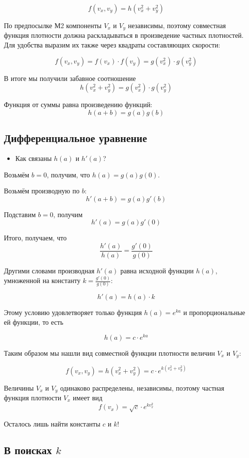 \documentclass[11pt,russian,]{article}
\providecommand{\tightlist}{%
  \setlength{\itemsep}{0pt}\setlength{\parskip}{0pt}}
\begin{document}
\[
f(v_x, v_y) = h(v_x^2 + v_y^2)
\]

По предпосылке М2 компоненты \(V_x\) и \(V_y\) независимы, поэтому
совместная функция плотности должна раскладываться в произведение
частных плотностей. Для удобства выразим их также через квадраты
составляющих скорости:

\[
f(v_x, v_y) = f(v_x) \cdot f(v_y) = g(v_x^2) \cdot g(v_y^2)
\]

В итоге мы получили забавное соотношение \[
h(v_x^2 + v_y^2) = g(v_x^2) \cdot g(v_y^2)
\]

Функция от суммы равна произведению функций: \[
h(a + b) = g(a)g(b)
\]

\subsection{Дифференциальное уравнение}\label{-}

\begin{itemize}
\tightlist
\item
  Как связаны \(h(a)\) и \(h'(a)\)?
\end{itemize}

Возьмём \(b=0\), получим, что \(h(a)=g(a)g(0)\).

Возьмём производную по \(b\): \[
h'(a+b)=g(a)g'(b)
\]

Подставим \(b=0\), получим \[
h'(a)=g(a)g'(0)
\]

Итого, получаем, что \[
\frac{h'(a)}{h(a)} = \frac{g'(0)}{g(0)}
\]

Другими словами производная \(h'(a)\) равна исходной функции \(h(a)\),
умноженной на константу \(k=\frac{g'(0)}{g(0)}\):

\[
h'(a) = h(a) \cdot k
\]

Этому условию удовлетворяет только функция \(h(a) = e^{ka}\) и
пропорциональные ей функции, то есть

\[
h(a) = c \cdot e^{ka}
\]

Таким образом мы нашли вид совместной функции плотности величин \(V_x\)
и \(V_y\):

\[
f(v_x, v_y) = h(v_x^2 + v_y^2) = c \cdot e^{k(v_x^2 + v_y^2)} 
\]

Величины \(V_x\) и \(V_y\) одинаково распределены, независимы, поэтому
частная функция плотности \(V_x\) имеет вид \[
f(v_x) = \sqrt{c} \cdot e^{kv_x^2}
\]

Осталось лишь найти константы \(c\) и \(k\)!

\subsection{\texorpdfstring{В поисках \(k\)}{В поисках k}}\label{--k}
\end{document}
